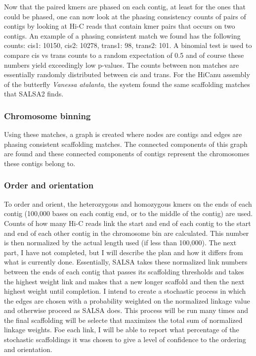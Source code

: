 {\par{
Now that the paired kmers are phased on each contig, at least for the ones that could be phased, one can now look at the phasing consistency counts of pairs of contigs by looking at Hi-C reads that contain kmer pairs that occurs on two contigs. An example of a phasing consistent match we found has the following counts:  cis1: 10150, cis2: 10278, trans1: 98, trans2: 101. A binomial test is used to compare cis vs trans counts to a random expectation of 0.5 and of course these numbers yield exceedingly low p-values. The counts between non matches are essentially randomly distributed between cis and trans. For the HiCanu assembly of the butterfly \textit{Vanessa atalanta}, the system found the same scaffolding matches that SALSA2 finds.
}

\subsubsection{Chromosome binning}

\par{
Using these matches, a graph is created where nodes are contigs and edges are phasing consistent scaffolding matches. The connected components of this graph are found and these connected components of contigs represent the chromosomes these contigs belong to. 
}

\subsubsection{Order and orientation}

\par{
To order and orient, the heterozygous and homozygous kmers on the ends of each contig (100,000 bases on each contig end, or to the middle of the contig) are used. Counts of how many Hi-C reads link the start and end of each contig to the start and end of each other contig in the chromosome bin are calculated. This number is then normalized by the actual length used (if less than 100,000). The next part, I have not completed, but I will describe the plan and how it differs from what is currently done. Essentially, SALSA takes these normalized link numbers between the ends of each contig that passes its scaffolding thresholds and takes the highest weight link and makes that a new longer scaffold and then the next highest weight until completion. I intend to create a stochastic process in which the edges are chosen with a probability weighted on the normalized linkage value and otherwise proceed as SALSA does. This process will be run many times and the final scaffolding will be selecte that maximizes the total sum of normalized linkage weights. Foe each link, I will be able to report what percentage of the stochastic scaffoldings it was chosen to give a level of confidence to the ordering and orientation.
}

}
